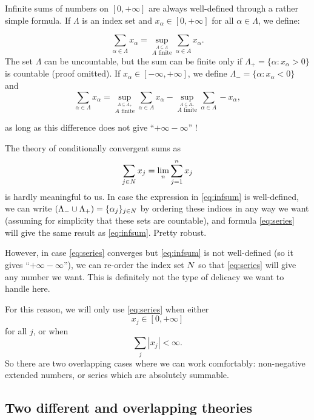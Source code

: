 \documentclass[
]{book}
\theoremstyle{definition}
\theoremstyle{remark}
\let\mathbb\relax %
\newcommand{\N}{\mathbb{N}}
\begin{document}
Infinite sums of numbers on \([0,+\infty]\) are always well-defined
through a rather simple formula. If \(\Lambda\) is an index set and
\(x_\alpha \in [0,+\infty]\) for all \(\alpha \in \Lambda\), we define:

\[\nonumber
\sum_{\alpha \in \Lambda} x_\alpha = \sup_{\stackrel{A \subseteq \Lambda}{A \text{ finite}}} \sum_{\alpha \in A} x_\alpha
.\] The set \(\Lambda\) can be uncountable, but the sum can be finite only
if \(\Lambda_+ = \{\alpha:x_\alpha>0\}\) is countable (proof omitted). If
\(x_\alpha \in [-\infty,+\infty]\), we define
\(\Lambda_- = \{\alpha:x_\alpha<0\}\) and
\begin{equation}
\label{eq:infsum}
\sum_{\alpha \in \Lambda} x_\alpha =
\sup_{\stackrel{A \subseteq \Lambda_+}{A \text{ finite}}} \sum_{\alpha \in A} x_\alpha
-
\sup_{\stackrel{A \subseteq \Lambda_-}{A \text{ finite}}} \sum_{\alpha \in A} -x_\alpha
,
\end{equation}

as long as this difference does not give ``\(+\infty-\infty\)'' !

The theory of conditionally convergent sums as
\begin{equation}
\sum_{j \in \N} x_j
=
\lim_n
\sum_{j = 1}^n x_j
\label{eq:series}
\end{equation}
is hardly meaningful to us. In case the expression
in \eqref{eq:infsum} is well-defined, we can write
\((\Lambda_- \cup \Lambda_+) = \{\alpha_j\}_{j\in\N}\) by ordering these
indices in any way we want (assuming for simplicity that these sets are
countable), and formula \eqref{eq:series} will give the same result
as \eqref{eq:infsum}. Pretty robust.

However, in case \eqref{eq:series} converges
but \eqref{eq:infsum} is not well-defined (so it gives
``\(+\infty-\infty\)''), we can re-order the index set \(\N\) so
that \eqref{eq:series} will give any number we want. This is definitely
not the type of delicacy we want to handle here.

For this reason, we will only
use \eqref{eq:series} when either \[x_j \in [0,+\infty]\] for all \(j\),
or when \[\sum_j |x_j| < \infty .\] So there are two overlapping cases
where we can work comfortably: non-negative extended numbers, or series
which are absolutely summable.

\hypertarget{two-different-and-overlapping-theories}{%
\subsection{Two different and overlapping theories}\label{two-different-and-overlapping-theories}}
\end{document}
